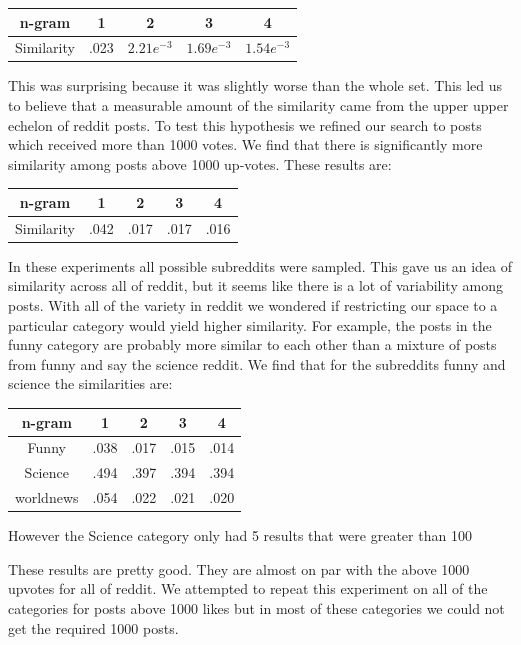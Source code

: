 \documentclass[12pt]{article}
\numberwithin{equation}{section}
\begin{document}
\begin{table}[h!]
	  \begin{tabular}{c | c c c c}
	  n-gram & 1 & 2 & 3 & 4\\
	  \hline
	  Similarity & .023 & $2.21e^{-3}$ & $1.69e^{-3}$ & $1.54e^{-3}$
	  \end{tabular}
	\end{table}
	This was surprising because it was slightly worse than the whole set.  This led us to believe that a measurable amount of the similarity came from the upper upper echelon of reddit posts.  To test this hypothesis we refined our search to posts which received more than 1000 votes.  We find that there is significantly more similarity among posts above 1000 up-votes.  These results are:\newline
	
	\begin{table}[h!]
	  \begin{tabular}{c | c c c c}
	  n-gram & 1 & 2 & 3 & 4\\
	  \hline
	  Similarity & .042 & .017 & .017 & .016
	  \end{tabular}
	\end{table}
	
	In these experiments all possible subreddits were sampled.  This gave us an idea of similarity across all of reddit, but it seems like there is a lot of variability among posts.  With all of the variety in reddit we wondered if restricting our space to a particular category would yield higher similarity.  For example, the posts in the funny category are probably more similar to each other than a mixture of posts from funny and say the science reddit.  We find that for the subreddits funny and science the similarities are:
	
		\begin{table}[h!]
	  \begin{tabular}{c | c c c c}
	  n-gram & 1 & 2 & 3 & 4\\
	  \hline
	  Funny & .038 & .017 & .015 & .014\\
	  Science & .494 & .397 & .394 & .394\\
	  worldnews & .054 & .022 & .021 & .020
	  \end{tabular}
	\end{table}
	However the Science category only had 5 results that were greater than 100
	
These results are pretty good.  They are almost on par with the above 1000 upvotes for all of reddit.   We attempted to repeat this experiment on all of the categories for posts above 1000 likes but in most of these categories we could not get the required 1000 posts.
\end{document}
